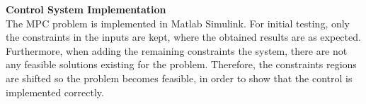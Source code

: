 \textbf{Control System Implementation}\\
The MPC problem is implemented in Matlab Simulink. For initial testing, only the constraints in the inputs are kept, where the obtained results are as expected. Furthermore, when adding the remaining constraints the system, there are not any feasible solutions existing for the problem. Therefore, the constraints regions are shifted so the problem becomes feasible, in order to show that the control is implemented correctly. 





